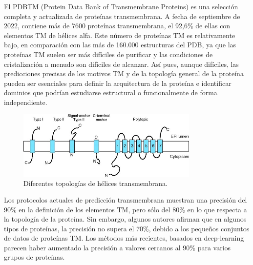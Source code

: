 El PDBTM (Protein Data Bank of Transmembrane Proteins) es una selección completa y actualizada de proteínas transmembrana. A fecha de septiembre de 2022, contiene más de 7600 proteínas transmembrana, el 92,6\% de ellas con elementos TM de hélices alfa. Este número de proteínas TM es relativamente bajo, en comparación con las más de 160.000 estructuras del PDB, ya que las proteínas TM suelen ser más difíciles de purificar y las condiciones de cristalización a menudo son difíciles de alcanzar. Así pues, aunque difíciles, las predicciones precisas de los motivos TM y de la topología general de la proteína pueden ser esenciales para definir la arquitectura de la proteína e identificar dominios que podrían estudiarse estructural o funcionalmente de forma independiente.

\begin{figure}[h]
\centering
\includegraphics[width = 0.8\textwidth]{figs/alphaTM.jpg}
\caption{Diferentes topologías de hélices transmembrana.}
\end{figure}

Los protocolos actuales de predicción transmembrana muestran una precisión del 90\% en la definición de los elementos TM, pero sólo del 80\% en lo que respecta a la topología de la proteína. Sin embargo, algunos autores afirman que en algunos tipos de proteínas, la precisión no supera el 70\%, debido a los pequeños conjuntos de datos de proteínas TM. Los métodos más recientes, basados en deep-learning parecen haber aumentado la precisión a valores cercanos al 90\% para varios grupos de proteínas.

